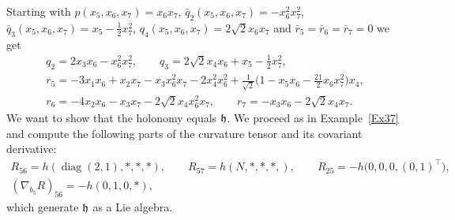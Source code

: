 \documentclass[pdftex]{sigma}
\numberwithin{equation}{section}
\newcommand\fh{{\frak h}}
\newcommand{\diag}{\operatorname{diag}}
\begin{document}
\begin{Example}
Starting with $p(x_5,x_6,x_7)=x_6x_7$, $\bar q_2(x_5,x_6,x_7)=-x_6^2x_7^2$, $\bar q_3(x_5,x_6,x_7)= x_5-\frac 12x_7^2$, $q_4(x_5,x_6,x_7)=2\sqrt2 x_6 x_7$ and $\bar r_5 =\bar r_6=\bar r_7=0$ we get
\begin{gather*}
q_2= 2x_3 x_6-x_6^2x_7^2, \qquad
q_3= 2\sqrt2 x_4 x_6 +x_5- \tfrac12 x_7^2, \\
r_5= -3x_1 x_6+x_2 x_7 -x_3 x_6^2x_7 -2 x_4^2x_6^2 +\tfrac1{\sqrt2}\big(1-x_5x_6-\tfrac{21}2 x_6 x_7^2\big) x_4, \\
r_6= -4x_2 x_6-x_3x_7-2\sqrt2 x_4 x_6^2 x_7, \qquad
r_7= -x_3x_6-2\sqrt2 x_4 x_7 .
\end{gather*}
We want to show that the holonomy equals $\fh$. We proceed as in Example~\ref{Ex37} and compute the following parts of the curvature tensor and its covariant derivative:
\begin{gather*}
R_{56}=h(\diag(2,1), *,*,*),\qquad R_{57}=h(N,*,*,*,),\qquad R_{25}=-h\big(0,0,0,(0,1)^\top\big),\\
(\nabla_{b_5} R)_{56}=-h(0,1,0,*),
\end{gather*}
which generate $\fh$ as a Lie algebra.
\end{Example}
\end{document}
